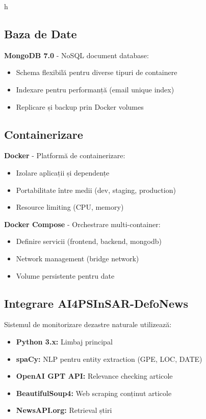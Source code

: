 h\documentclass[12pt,a4paper]{article}
\begin{document}
\subsection{Baza de Date}

\textbf{MongoDB 7.0} - NoSQL document database:
\begin{itemize}
    \item Schema flexibilă pentru diverse tipuri de containere
    \item Indexare pentru performanță (email unique index)
    \item Replicare și backup prin Docker volumes
\end{itemize}


\subsection{Containerizare}

\textbf{Docker} - Platformă de containerizare:
\begin{itemize}
    \item Izolare aplicații și dependențe
    \item Portabilitate între medii (dev, staging, production)
    \item Resource limiting (CPU, memory)
\end{itemize}

\textbf{Docker Compose} - Orchestrare multi-container:
\begin{itemize}
    \item Definire servicii (frontend, backend, mongodb)
    \item Network management (bridge network)
    \item Volume persistente pentru date
\end{itemize}

\subsection{Integrare AI4PSInSAR-DefoNews}

Sistemul de monitorizare dezastre naturale utilizează:
\begin{itemize}
    \item \textbf{Python 3.x:} Limbaj principal
    \item \textbf{spaCy:} NLP pentru entity extraction (GPE, LOC, DATE)
    \item \textbf{OpenAI GPT API:} Relevance checking articole
    \item \textbf{BeautifulSoup4:} Web scraping conținut articole
    \item \textbf{NewsAPI.org:} Retrieval știri
\end{itemize}
\end{document}
